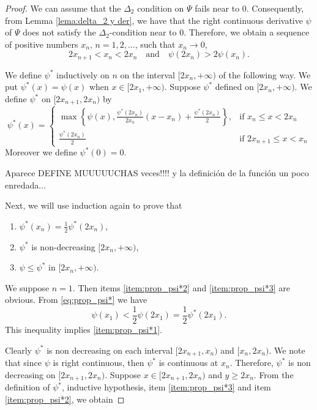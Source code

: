 \documentclass[twoside]{article}
\theoremstyle{remark}
\renewcommand{\leq}{\leqslant}
\renewcommand{\geq}{\geqslant}
\begin{document}
\begin{proof} We can assume that the $\Delta_2$ condition on $\Psi$ fails near to $0$. Consequently, from Lemma \ref{lema:delta_2 y der}, we have that the right continuous derivative $\psi$ of $\Psi$ does not satisfy the $\Delta_2$-condition near to $0$. 
Therefore, we obtain a sequence of positive numbers $x_n$, $n=1,2,\ldots$,  such that $x_n\to 0$, 
\begin{equation}\label{eq:prop_psi*}2x_{n+1}<x_n<2x_n\quad\text{and}\quad \psi(2x_n)> 2\psi(x_n).
 \end{equation}

We define $\psi^*$ inductively on $n$ on the interval $[2x_n,+\infty)$ of the following way.   
We put $\psi^*(x)=\psi(x)$ when  $x\in[ 2x_1,+\infty)$. 
Suppose $\psi^*$ defined on $[2x_n,+\infty)$. We define $\psi^*$ on $[2x_{n+1},2x_n)$ by
\[
 \psi^*(x)=\left\{
\begin{array}{cc}
  \max\left\{\psi(x),\frac{\psi^*(2x_n)}{2x_n}(x-x_n)+\frac{ \psi^*(2x_n)}{2}\right\},& \text{if } x_n\leq x<2x_n\\
   \frac{\psi^*(2x_n)}{2}& \text{if }2x_{n+1} \leq x<x_n
  \end{array}
\right.
\]
Moreover we define $\psi^*(0)=0$. 

Aparece DEFINE MUUUUUCHAS  veces!!!! y la definici\'on de la funci\'on un poco enredada...

Next, we will use induction again  to prove that
\begin{enumerate}
 \item\label{item:prop_psi*1} $\psi^*(x_n)=\frac12\psi^*(2x_n)$,
 \item\label{item:prop_psi*2}  $\psi^*$ is non-decreasing $[2x_{n},+\infty)$,
 \item\label{item:prop_psi*3}   $\psi\leq \psi^*$ in  $[2x_{n},+\infty)$.
\end{enumerate}

We suppose $n=1$. Then items \ref{item:prop_psi*2} and \ref{item:prop_psi*3} are obvious. From \eqref{eq:prop_psi*} we have
\[\psi(x_1)<\frac12\psi(2x_1)=\frac12\psi^*(2x_1).\]
This inequality implies \ref{item:prop_psi*1}.

 Clearly $\psi^*$ is non decreasing on each interval $[2x_{n+1},x_n)$ and $[x_n,2x_n)$. We note that since $\psi$ is right continuous, then $\psi^*$ is continuous at $x_n$. Therefore, $\psi^*$ is non decreasing on $[2x_{n+1},2x_n)$. Suppose $x\in[2x_{n+1},2x_n)$ and $y\geq 2x_n$.  From the definition of $\psi^*$, inductive hypothesis, item \ref{item:prop_psi*3} and item \ref{item:prop_psi*2}, we obtain


\end{proof}
\end{document}
